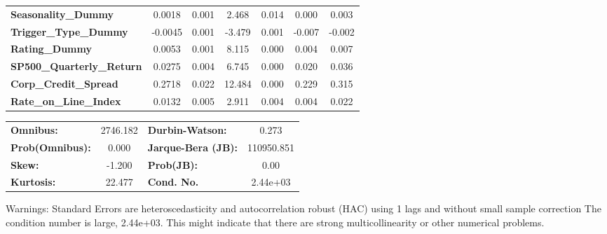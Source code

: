 \begin{center}
\begin{tabular}{lcccccc}
\textbf{Seasonality\_Dummy}       &       0.0018  &        0.001     &     2.468  &         0.014        &        0.000    &        0.003     \\
\textbf{Trigger\_Type\_Dummy}     &      -0.0045  &        0.001     &    -3.479  &         0.001        &       -0.007    &       -0.002     \\
\textbf{Rating\_Dummy}            &       0.0053  &        0.001     &     8.115  &         0.000        &        0.004    &        0.007     \\
\textbf{SP500\_Quarterly\_Return} &       0.0275  &        0.004     &     6.745  &         0.000        &        0.020    &        0.036     \\
\textbf{Corp\_Credit\_Spread}     &       0.2718  &        0.022     &    12.484  &         0.000        &        0.229    &        0.315     \\
\textbf{Rate\_on\_Line\_Index}    &       0.0132  &        0.005     &     2.911  &         0.004        &        0.004    &        0.022     \\
\bottomrule
\end{tabular}
\begin{tabular}{lclc}
\textbf{Omnibus:}       & 2746.182 & \textbf{  Durbin-Watson:     } &     0.273   \\
\textbf{Prob(Omnibus):} &   0.000  & \textbf{  Jarque-Bera (JB):  } & 110950.851  \\
\textbf{Skew:}          &  -1.200  & \textbf{  Prob(JB):          } &      0.00   \\
\textbf{Kurtosis:}      &  22.477  & \textbf{  Cond. No.          } &  2.44e+03   \\
\bottomrule
\end{tabular}
\end{center}

Warnings: \newline
 [1] Standard Errors are heteroscedasticity and autocorrelation robust (HAC) using 1 lags and without small sample correction \newline
 [2] The condition number is large, 2.44e+03. This might indicate that there are \newline
 strong multicollinearity or other numerical problems.